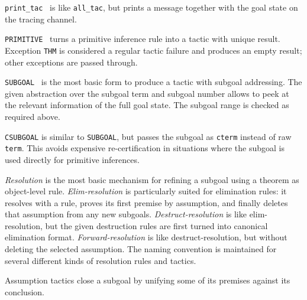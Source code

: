 \begin{isabellebody}
\begin{isamarkuptext}
\begin{description}
  \item \verb|print_tac|~ is like \verb|all_tac|, but
  prints a message together with the goal state on the tracing
  channel.

  \item \verb|PRIMITIVE|~ turns a primitive inference rule
  into a tactic with unique result.  Exception \verb|THM| is considered
  a regular tactic failure and produces an empty result; other
  exceptions are passed through.

  \item \verb|SUBGOAL|~ is the
  most basic form to produce a tactic with subgoal addressing.  The
  given abstraction over the subgoal term and subgoal number allows to
  peek at the relevant information of the full goal state.  The
  subgoal range is checked as required above.

  \item \verb|CSUBGOAL| is similar to \verb|SUBGOAL|, but passes the
  subgoal as \verb|cterm| instead of raw \verb|term|.  This
  avoids expensive re-certification in situations where the subgoal is
  used directly for primitive inferences.

  \end{description}%
\end{isamarkuptext}%
\isamarkuptrue%
%
\endisatagmlref
{\isafoldmlref}%
%
\isadelimmlref
%
\endisadelimmlref
%
\isamarkuptrue%
%
\begin{isamarkuptext}%
\emph{Resolution} is the most basic mechanism for refining a
  subgoal using a theorem as object-level rule.
  \emph{Elim-resolution} is particularly suited for elimination rules:
  it resolves with a rule, proves its first premise by assumption, and
  finally deletes that assumption from any new subgoals.
  \emph{Destruct-resolution} is like elim-resolution, but the given
  destruction rules are first turned into canonical elimination
  format.  \emph{Forward-resolution} is like destruct-resolution, but
  without deleting the selected assumption.  The 
  naming convention is maintained for several different kinds of
  resolution rules and tactics.

  Assumption tactics close a subgoal by unifying some of its premises
  against its conclusion.


\end{isamarkuptext}
\end{isabellebody}
